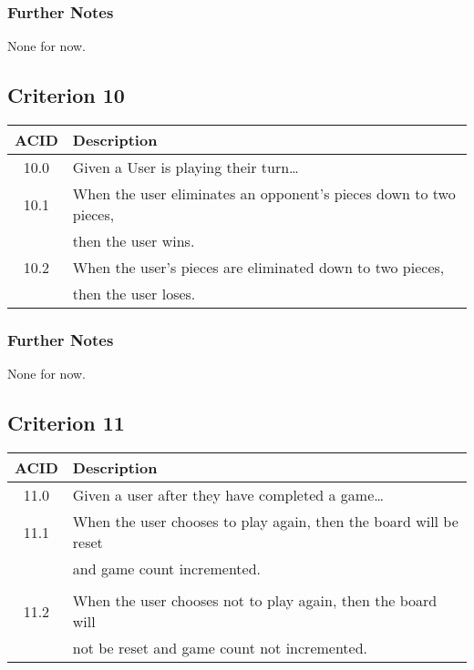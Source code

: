 \documentclass[11pt]{article}
\begin{document}
\subsubsection*{Further Notes}
\label{sec:org9a55aa7}
None for now.

\subsection{Criterion 10}
\label{sec:org5c8cfcc}
\begin{center}
\begin{tabular}{|c|l|}
ACID & Description\\
\hline
10.0 & Given a User is playing their turn\ldots{}\\
\hline
10.1 & When the user eliminates an opponent's pieces down to two pieces,\\
 & then the user wins.\\
10.2 & When the user's pieces are eliminated down to two pieces,\\
 & then the user loses.\\
\end{tabular}
\end{center}

\subsubsection*{Further Notes}
\label{sec:orgcc4ea8e}
None for now.

\subsection{Criterion 11}
\label{sec:org63f696e}
\begin{center}
\begin{tabular}{|c|l|}
ACID & Description\\
\hline
11.0 & Given a user after they have completed a game\ldots{}\\
\hline
11.1 & When the user chooses to play again, then the board will be reset\\
 & and game count incremented.\\
 & \\
11.2 & When the user chooses not to play again, then the board will\\
 & not be reset and game count not incremented.\\
\end{tabular}
\end{center}
\end{document}
